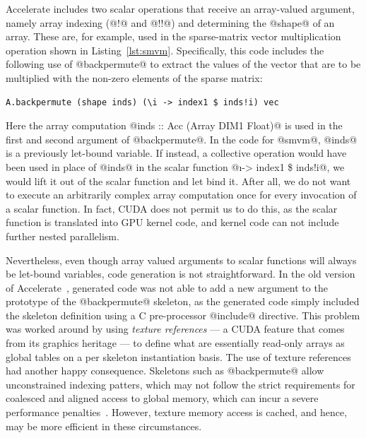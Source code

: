 Accelerate includes two scalar operations that receive an array-valued argument,
namely array indexing (@!@ and @!!@) and determining the @shape@
of an array. These are, for example, used in the sparse-matrix vector
multiplication operation shown in Listing~\ref{lst:smvm}. Specifically, this
code includes the following use of @backpermute@ to extract the values of
the vector that are to be multiplied with the non-zero elements of the sparse
matrix:
%
\begin{lstlisting}[style=haskell]
A.backpermute (shape inds) (\i -> index1 $ inds!i) vec
\end{lstlisting}
%
Here the array computation @inds :: Acc (Array DIM1 Float)@ is used in the
first and second argument of @backpermute@. In the code for @smvm@,
@inds@ is a previously let-bound variable. If instead, a collective
operation would have been used in place of @inds@ in the scalar function
@\i -> index1 \$ inds!i@, we would lift it out of the scalar function and
let bind it. After all, we do not want to execute an arbitrarily complex array
computation once for every invocation of a scalar function. In fact, CUDA does
not permit us to do this, as the scalar function is translated into GPU kernel
code, and kernel code can not include further nested parallelism.

Nevertheless, even though array valued arguments to scalar functions will always
be let-bound variables, code generation is not straightforward. In the old
version of Accelerate~\cite{Chakravarty:2011fr}, generated code was not able to
add a new argument to the prototype of the @backpermute@ skeleton, as the
generated code simply included the skeleton definition using a C pre-processor
@include@ directive. This problem was worked around by using \emph{texture
references} --- a CUDA feature that comes from its graphics heritage --- to
define what are essentially read-only arrays as global tables on a per skeleton
instantiation basis. The use of texture references had another happy
consequence. Skeletons such as @backpermute@ allow unconstrained indexing
patters, which may not follow the strict requirements for coalesced and aligned
access to global memory, which can incur a severe performance
penalties~\cite{NVIDIA:2012wf}. However, texture memory access is cached, and
hence, may be more efficient in these circumstances.

